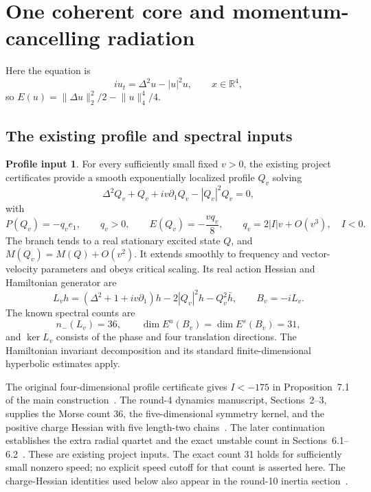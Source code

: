 \documentclass[11pt]{article}
\theoremstyle{definition}
\newtheorem{assumption}[theorem]{Profile input}
\theoremstyle{remark}
\newcommand{\R}{\mathbb R}
\newcommand{\norm}[1]{\lVert #1\rVert}
\begin{document}
\section{One coherent core and momentum-cancelling radiation}
\label{sec:radiation}

Here the equation is
\begin{equation}\label{eq:4dbnls}
 iu_t=\Delta^2u-|u|^2u,\qquad x\in\R^4,
\end{equation}
so $E(u)=\norm{\Delta u}_2^2/2-\norm{u}_4^4/4$.

\subsection{The existing profile and spectral inputs}\label{sec:input}

\begin{assumption}\label{ass:cert}
For every sufficiently small fixed $v>0$, the existing project certificates provide a smooth exponentially localized profile $Q_v$ solving
\[
 \Delta^2Q_v+Q_v+iv\partial_1Q_v-|Q_v|^2Q_v=0,
\]
with
\begin{equation}\label{eq:wavecharges}
 P(Q_v)=-q_v e_1,\qquad q_v>0,\qquad
 E(Q_v)=-\frac{vq_v}{8},\qquad
 q_v=2|I|v+O(v^3),\quad I<0.
\end{equation}
The branch tends to a real stationary excited state $Q$, and $M(Q_v)=M(Q)+O(v^2)$. It extends smoothly to frequency and vector-velocity parameters and obeys critical scaling. Its real action Hessian and Hamiltonian generator are
\[
 L_vh=(\Delta^2+1+iv\partial_1)h-2|Q_v|^2h-Q_v^2\bar h,
 \qquad B_v=-iL_v.
\]
The known spectral counts are
\begin{equation}\label{eq:spectralinput}
 n_-(L_v)=36,\qquad
 \dim E^u(B_v)=\dim E^s(B_v)=31,
\end{equation}
and $\ker L_v$ consists of the phase and four translation directions. The Hamiltonian invariant decomposition and its standard finite-dimensional hyperbolic estimates apply.
\end{assumption}

The original four-dimensional profile certificate gives $I<-175$ in Proposition~7.1 of the main construction~\cite{ProjectProfile}. The round-4 dynamics manuscript, Sections~2--3, supplies the Morse count 36, the five-dimensional symmetry kernel, and the positive charge Hessian with five length-two chains~\cite{ProjectR4}. The later continuation establishes the extra radial quartet and the exact unstable count in Sections~6.1--6.2~\cite{ProjectR5}. These are existing project inputs. The exact count 31 holds for sufficiently small nonzero speed; no explicit speed cutoff for that count is asserted here. The charge-Hessian identities used below also appear in the round-10 inertia section~\cite{ProjectR10}.
\end{document}

